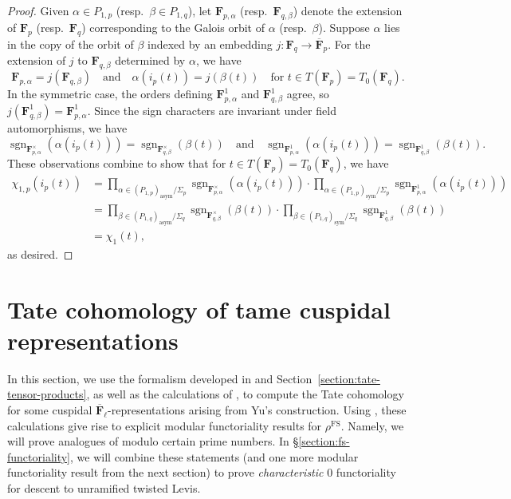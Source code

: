 \documentclass[reqno]{amsart}
\numberwithin{equation}{subsection}
\newcommand{\F}{\mathbf{F}}
\newcommand{\sgn}{\operatorname{sgn}}
\newcommand{\ol}[1]{\overline{#1}}
\newcommand{\co}{\colon}
\DeclareMathOperator{\FS}{FS}
\theoremstyle{remark}
\numberwithin{equation}{subsection}
\numberwithin{figure}{subsection}
\begin{document}
\begin{proof}
Given $\alpha \in P_{1,p}$ (resp.\ $\beta \in P_{1,q}$), let $\F_{p,\alpha}$ (resp.\ $\F_{q,\beta}$) denote the extension of $\F_p$ (resp.\ $\F_q$) corresponding to the Galois orbit of $\alpha$ (resp.\ $\beta$). Suppose $\alpha$ lies in the copy of the orbit of $\beta$ indexed by an embedding $j\co \F_q \to \ol\F_p$. For the extension of $j$ to $\F_{q,\beta}$ determined by $\alpha$, we have
\[
\F_{p,\alpha}=j(\F_{q,\beta}) \quad \text{and} \quad \alpha(i_p(t)) = j(\beta(t)) \quad \text{for } t \in T(\F_p)=T_0(\F_q).
\]
In the symmetric case, the orders defining $\F_{p,\alpha}^1$ and $\F_{q,\beta}^1$ agree, so $j(\F_{q,\beta}^1)=\F_{p,\alpha}^1$. Since the sign characters are invariant under field automorphisms, we have
\[
\sgn_{\F_{p,\alpha}^\times}(\alpha(i_p(t))) = \sgn_{\F_{q,\beta}^\times}(\beta(t)) \quad \text{and} \quad \sgn_{\F_{p,\alpha}^1}(\alpha(i_p(t))) = \sgn_{\F_{q,\beta}^1}(\beta(t)).
\]
These observations combine to show that for $t \in T(\F_p) = T_0(\F_q)$, we have
\[
\begin{aligned}
\chi_{1,p}(i_p(t)) &= \prod_{\alpha \in (P_{1,p})_{\mathrm{asym}}/\Sigma_p} \sgn_{\F_{p,\alpha}^\times}(\alpha(i_p(t))) \cdot \prod_{\alpha \in (P_{1,p})_{\mathrm{sym}}/\Sigma_p} \sgn_{\F_{p,\alpha}^1}(\alpha(i_p(t))) \\
    &= \prod_{\beta \in (P_{1,q})_{\mathrm{asym}}/\Sigma_q} \sgn_{\F_{q,\beta}^\times}(\beta(t)) \cdot \prod_{\beta \in (P_{1,q})_{\mathrm{sym}}/\Sigma_q} \sgn_{\F_{q,\beta}^1}(\beta(t)) \\
    &= \chi_1(t),
\end{aligned}
\]
as desired.
\end{proof}


\section{Tate cohomology of tame cuspidal representations}\label{section:tate-cohom-yu}

In this section, we use the formalism developed in \cite[\S 3]{Cot26b} and Section~\ref{section:tate-tensor-products}, as well as the calculations of \cite{Cot26b}, to compute the Tate cohomology for some cuspidal $\ol\F_\ell$-representations arising from Yu's construction. Using \cite[Theorem 1.3.1]{F24}, these calculations give rise to explicit modular functoriality results for $\rho^{\FS}$. Namely, we will prove analogues of \cite[Propositions~8.2.3, 8.3.1, and Theorem~9.3.3]{CF26a} modulo certain prime numbers. In \S\ref{section:fs-functoriality}, we will combine these statements (and one more modular functoriality result from the next section) to prove \emph{characteristic} $0$ functoriality for descent to unramified twisted Levis.
\end{document}
